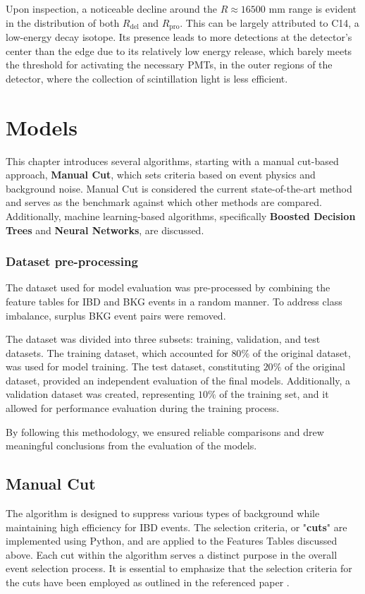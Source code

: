 Upon inspection, a noticeable decline around the $R \approx 16500$ mm range is evident in the distribution of both \(R_{\text{del}}\) and \(R_{\text{pro}}\). This can be largely attributed to C14, a low-energy decay isotope. Its presence leads to more detections at the detector's center than the edge due to its relatively low energy release, which barely meets the threshold for activating the necessary PMTs, in the outer regions of the detector, where the collection of scintillation light is less efficient.

\section{Models}
This chapter introduces several algorithms, starting with a manual cut-based approach, \textbf{Manual Cut}, which sets criteria based on event physics and background noise. Manual Cut is considered the current state-of-the-art method and serves as the benchmark against which other methods are compared. Additionally, machine learning-based algorithms, specifically \textbf{Boosted Decision Trees} and \textbf{Neural Networks}, are discussed. 

\subsubsection{Dataset pre-processing}
The dataset used for model evaluation was pre-processed by combining the feature tables for IBD and BKG events in a random manner. To address class imbalance, surplus BKG event pairs were removed.

The dataset was divided into three subsets: training, validation, and test datasets. The training dataset, which accounted for $80\%$ of the original dataset, was used for model training. The test dataset, constituting $20\%$ of the original dataset, provided an independent evaluation of the final models. Additionally, a validation dataset was created, representing $10\%$ of the training set, and it allowed for performance evaluation during the training process.

By following this methodology, we ensured reliable comparisons and drew meaningful conclusions from the evaluation of the models.

\subsection{Manual Cut}
The algorithm is designed to suppress various types of background while maintaining high efficiency for IBD events. The selection criteria, or "\textbf{cuts}" are implemented using Python, and are applied to the Features Tables discussed above. Each cut within the algorithm serves a distinct purpose in the overall event selection process. It is essential to emphasize that the selection criteria for the cuts have been employed as outlined in the referenced paper \cite{Sub_osci}.

